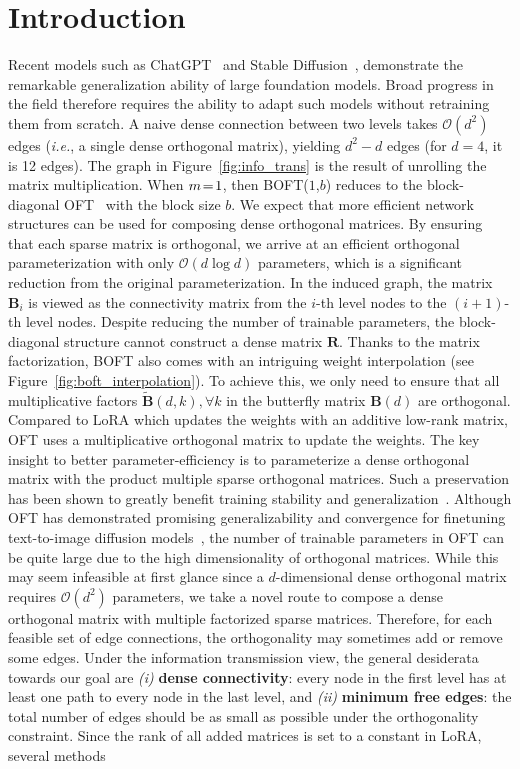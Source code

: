 \section{Introduction}

Recent models such as ChatGPT~\cite{brown2020language,chen2021evaluating} and Stable Diffusion~\cite{rombach2022high}, demonstrate the remarkable generalization ability of large foundation models. Broad progress in the field therefore requires the ability to adapt such models without retraining them from scratch. A naive dense connection between two levels takes $\mathcal{O}(d^2)$ edges (\emph{i.e.}, a single dense orthogonal matrix), yielding $d^2-d$ edges (for $d=4$, it is 12 edges). The graph in Figure~\ref{fig:info_trans} is the result of unrolling the matrix multiplication. When $\thickmuskip=2mu \medmuskip=2mu m=1$, then BOFT($1$,$b$) reduces to the block-diagonal OFT~\cite{qiu2023controlling} with the block size $b$. We expect that more efficient network structures can be used for composing dense orthogonal matrices. By ensuring that each sparse matrix is orthogonal, we arrive at an efficient orthogonal parameterization with only $\mathcal{O}(d\log d)$  parameters, which is a significant reduction from the original parameterization. In the induced graph, the matrix $\bm{B}_i$ is viewed as the connectivity matrix from the $i$-th level nodes to the $(i+1)$-th level nodes. Despite reducing the number of trainable parameters, the block-diagonal structure cannot construct a dense matrix $\bm{R}$. Thanks to the matrix factorization, BOFT also comes with an intriguing weight interpolation (see Figure~\ref{fig:boft_interpolation}). To achieve this, we only need to ensure that all multiplicative factors $\tilde{\bm{B}}(d,k),\forall k$ in the butterfly matrix $\bm{B}(d)$ are orthogonal. Compared to LoRA which updates the weights with an additive low-rank matrix, OFT uses a multiplicative orthogonal matrix to update the weights. The key insight to better parameter-efficiency is to parameterize a dense orthogonal matrix with the product multiple sparse orthogonal matrices. Such a preservation has been shown to greatly benefit training stability and generalization~\cite{miyato2018spectral,yoshida2017spectral}. Although OFT has demonstrated promising generalizability and convergence for finetuning text-to-image diffusion models~\cite{qiu2023controlling}, the number of trainable parameters in OFT can be quite large due to the high dimensionality of orthogonal matrices. While this may seem infeasible at first glance since a $d$-dimensional dense orthogonal matrix requires $\mathcal{O}(d^2)$ parameters, we take a novel route to compose a dense orthogonal matrix with multiple factorized sparse matrices. Therefore, for each feasible set of edge connections, the orthogonality may sometimes add or remove some edges. Under the information transmission view, the general desiderata towards our goal are \emph{(i)} \textbf{dense connectivity}: every node in the first level has at least one path to every node in the last level, and \emph{(ii)} \textbf{minimum free edges}: the total number of edges should be as small as possible under the orthogonality constraint. Since the rank of all added matrices is set to a constant in LoRA, several methods 